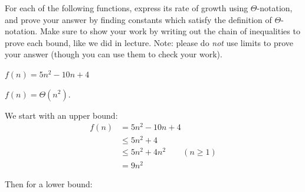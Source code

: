 \begin{prob}
    For each of the following functions, express its rate of growth using
    $\Theta$-notation, and prove your answer by finding constants which satisfy
    the definition of $\Theta$-notation. Make sure to show your work by writing
    out the chain of inequalities to prove each bound, like we did in lecture.
    Note: please do \emph{not} use limits to prove your answer (though you can
    use them to check your work).

    \begin{subprobset}
        \begin{subprob}
            $f(n) = 5n^2 - 10n + 4$

            \begin{soln}
                $f(n) = \Theta(n^2)$.

                We start with an upper bound:
                \begin{align*}
                    f(n)
                    &= 5n^2 - 10n + 4 \\
                    &\leq
                        5n^2 + 4
                        \\
                    &\leq
                        5n^2 + 4n^2 \qquad (n \geq 1)
                        \\
                    &= 9n^2
                \end{align*}

                Then for a lower bound:


\end{soln}
\end{subprob}
\end{subprobset}
\end{prob}
